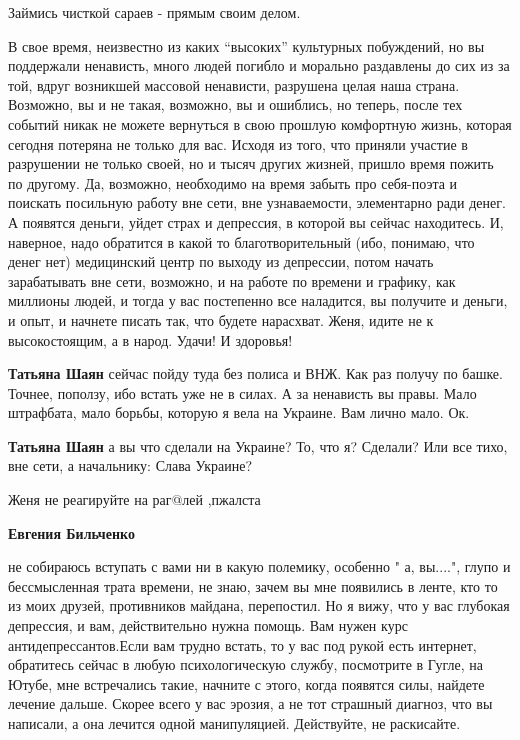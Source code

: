 \begin{itemize}
Займись чисткой сараев - прямым своим делом.


В свое время, неизвестно из каких \enquote{высоких} культурных побуждений, но вы
поддержали ненависть, много людей погибло и морально раздавлены до сих из за
той, вдруг возникшей массовой ненависти, разрушена целая наша страна. Возможно,
вы и не такая, возможно, вы и ошиблись, но теперь, после тех событий никак не
можете вернуться в свою прошлую комфортную жизнь, которая сегодня потеряна не
только для вас. Исходя из того, что приняли участие в разрушении не только
своей, но и тысяч других жизней, пришло время пожить по другому. Да, возможно,
необходимо на время забыть про себя-поэта и поискать посильную работу вне сети,
вне узнаваемости, элементарно ради денег. А появятся деньги, уйдет страх и
депрессия, в которой вы сейчас находитесь. И, наверное, надо обратится в какой
то благотворительный (ибо, понимаю, что денег нет) медицинский центр по выходу
из депрессии, потом начать зарабатывать вне сети, возможно, и на работе по
времени и графику, как миллионы людей, и тогда у вас постепенно все наладится,
вы получите и деньги, и опыт, и начнете писать так, что будете нарасхват. Женя,
идите не к высокостоящим, а в народ. Удачи! И здоровья!

\begin{itemize} %
\textbf{Татьяна Шаян} сейчас пойду туда без полиса и ВНЖ. Как раз получу по башке. Точнее, поползу, ибо встать уже не в силах. А за ненависть вы правы. Мало штрафбата, мало борьбы, которую я вела на Украине. Вам лично мало. Ок.

\textbf{Татьяна Шаян} а вы что сделали на Украине? То, что я? Сделали? Или все тихо, вне сети, а начальнику: Слава Украине?

Женя не реагируйте на раг@лей ,пжалста

\textbf{Евгения Бильченко} 

не собираюсь вступать с вами ни в какую полемику, особенно " а, вы....", глупо
и бессмысленная трата времени, не знаю, зачем вы мне появились в ленте, кто то
из моих друзей, противников майдана, перепостил. Но я вижу, что у вас глубокая
депрессия, и вам, действительно нужна помощь. Вам нужен курс
антидепрессантов.Если вам трудно встать, то у вас под рукой есть интернет,
обратитесь сейчас в любую психологическую службу, посмотрите в Гугле, на Ютубе,
мне встречались такие, начните с этого, когда появятся силы, найдете лечение
дальше. Скорее всего у вас эрозия, а не тот страшный диагноз, что вы написали,
а она лечится одной манипуляцией. Действуйте, не раскисайте.



\end{itemize}
\end{itemize}
